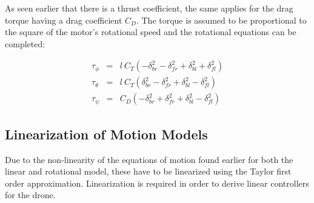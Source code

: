 

As seen earlier that there is a thrust coefficient, the same applies for the drag torque having a drag coefficient $C_D$. The torque is assumed to be proportional to the square of the motor's rotational speed and the rotational equations can be completed:

\begin{eqnarray}{}
	\tau_\phi &= & l \ C_T(-\delta_{br}^2 - \delta_{fr}^2 + \delta_{bl}^2 + \delta_{fl}^2)\\
	\tau_\theta &= & l \ C_T(\delta_{br}^2 - \delta_{fr}^2 + \delta_{bl}^2 - \delta_{fl}^2) \\
	\tau_\psi &= & C_D(-\delta_{br}^2 + \delta_{fr}^2 + \delta_{bl}^2 - \delta_{fl}^2)
\end{eqnarray}

\subsection{Linearization of Motion Models}

Due to the non-linearity of the equations of motion found earlier for both the linear and rotational model, these have to be linearized using the Taylor first order approximation. Linearization is required in order to derive linear controllers for the drone.\\

